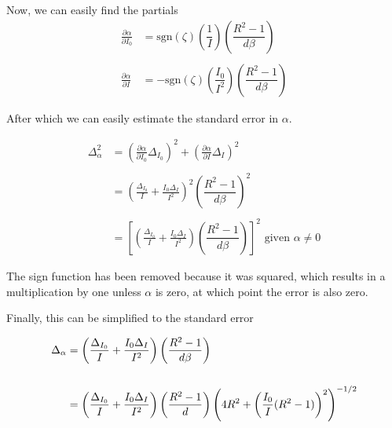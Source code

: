     Now, we can easily find the partials
    \begin{align*}
      \frac{\partial \alpha}{\partial I_0} &= \text{sgn}(\zeta)\left(\dfrac{1}{I}\right)\left(\dfrac{R^2-1}{d\beta}\right)\\\\
        \frac{\partial \alpha}{\partial I} &= -\text{sgn}(\zeta)\left(\dfrac{I_0}{I^2}\right)\left(\dfrac{R^2-1}{d\beta}\right)
    \end{align*}

    After which we can easily estimate the standard error in $\alpha$.

    \begin{align*}
      \Delta_\alpha^2 &= \left(\frac{\partial \alpha}{\partial I_0} \Delta_{I_0}\right)^2  + \left(\frac{\partial \alpha}{\partial I} \Delta_{I}\right)^2 \\\\
                      &= \left(\frac{\Delta_{I_0}}{I} + \frac{I_0\Delta_{I}}{I^2}\right)^2 \left(\dfrac{R^2-1}{d\beta}\right)^2 \\\\
                      &= \left[\left(\frac{\Delta_{I_0}}{I} + \frac{I_0\Delta_{I}}{I^2}\right)\left(\dfrac{R^2-1}{d\beta}\right)\right]^2 \text{ given $\alpha \neq 0$}
    \end{align*}

    The sign function has been removed because it was squared, which results in a multiplication by one unless $\alpha$ is zero, at which point the error is also zero.

    Finally, this can be simplified to the standard error

    \begin{align}
      \Delta_\alpha &= \left(\frac{\Delta_{I_0}}{I} + \frac{I_0\Delta_{I}}{I^2}\right) \left(\dfrac{R^2-1}{d\beta}\right) \notag\\\notag\\
                    &= \left(\frac{\Delta_{I_0}}{I} + \frac{I_0\Delta_{I}}{I^2}\right) \left(\dfrac{R^2-1}{d}\right)\left(4R^2+\left(\frac{I_0}{I}(R^2-1)\right)^2\right)^{-1/2} \label{eq:err_full}
    \end{align}
    {}

